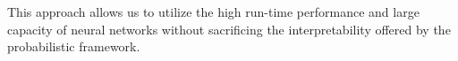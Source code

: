 \documentclass[12pt]{article}
\begin{document}
This approach allows us to utilize the high run-time performance and large capacity of neural networks 
without sacrificing the interpretability offered by the probabilistic framework.

% 


% 
% 
% 
% 
% 
\end{document}
